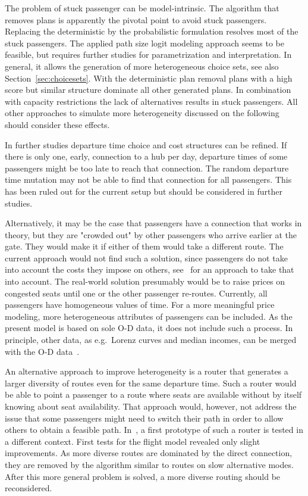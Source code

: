 The problem of stuck passenger can be model-intrinsic. 
The algorithm that removes plans is apparently the pivotal point to avoid stuck passengers. 
Replacing the deterministic by the probabilistic formulation resolves most of the stuck passengers. 
The applied path size logit modeling approach seems to be feasible, but requires further studies for parametrization and interpretation. 
In general, it allows the generation of more heterogeneous choice sets, see also Section~\ref{sec:choicesets}. 
With the deterministic plan removal plans with a high score but similar structure dominate all other generated plans. 
In combination with capacity restrictions the lack of alternatives results in stuck passengers.  
All other approaches to simulate more heterogeneity discussed on the following should consider these effects.  

In further studies departure time choice and cost structures can be refined. 
If there is only one, early, connection to a hub per day, departure times of some passengers might be too late to reach that connection. 
The random departure time mutation may not be able to find that connection for all passengers. 
This has been ruled out for the current setup but should be considered in further studies. 

Alternatively, it may be the case that passengers have a connection that works in theory, but they are "crowded out" by other passengers who arrive earlier at the gate.  
They would make it if either of them would take a different route.  
The current approach would not find such a solution, since passengers do not take into account the costs they impose on others, see~\citet{LaemmelFloetteroed2009KISysOptEvac} for an approach to take that into account.  
The real-world solution presumably would be to raise prices on congested seats until one or the other passenger re-routes. 
Currently, all passengers have homogeneous values of time.   
For a more meaningful price modeling, more heterogeneous attributes of passengers can be included. 
As the present model is based on sole O-D data, it does not include such a process. 
In principle, other data, as e.g.~Lorenz curves and median incomes, can be merged with the O-D data~\citep{KickhoeferEtAl2011PolicyEvaluationIncome}.  

An alternative approach to improve heterogeneity is a router that generates a larger diversity of routes even for the same departure time.  
Such a router would be able to point a passenger to a route where seats are available without by itself knowing about seat availability.  
That approach would, however, not address the issue that some passengers might need to switch their path in order to allow others to obtain a feasible path. 
In~\citet{Graf2013Da}, a first prototype of such a router is tested in a different context. 
First tests for the flight model revealed only slight improvements. 
As more diverse routes are dominated by the direct connection, they are removed by the algorithm similar to routes on slow alternative modes. 
After this more general problem is solved, a more diverse routing should be reconsidered. 

